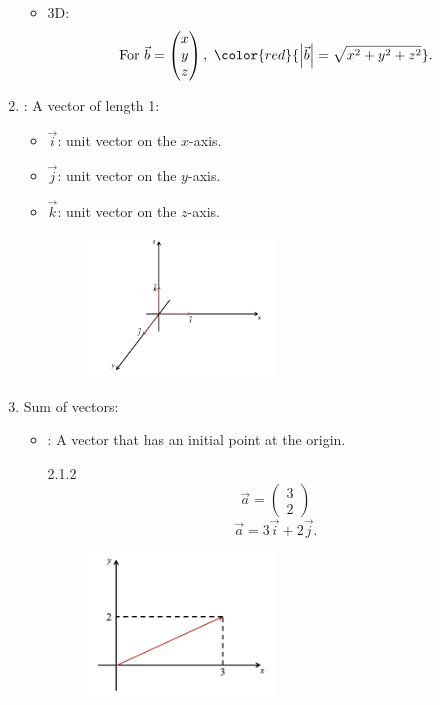 \documentclass[12pt, a4paper]{article}
\begin{document}
\begin{enumerate}
\begin{itemize}
    \item 3D: $$\text{For }\vec{b}=\begin{pmatrix}x\\y\\z\end{pmatrix},\ {\color{red}{\left|\vec{b}\right|=\sqrt{x^2+y^2+z^2}}}.$$
  \end{itemize}
  \item \textbf{\color{red}{Unit Vector}}: A vector of length 1: 
  \begin{itemize}
    \item $\vec{i}$: unit vector on the $x$-axis.
    \item $\vec{j}$: unit vector on the $y$-axis.
    \item $\vec{k}$: unit vector on the $z$-axis.
    \begin{figure}[H]
      \centering
      \includegraphics[width=0.5\textwidth]{Fig.3.jpg}
    \end{figure}
  \end{itemize}
  \item Sum of vectors: 
  \begin{itemize}
    \item \textbf{\color{red}{Position vector}}: A vector that has an initial point at the origin. 
    \begin{example}{2.1.2}{}
      $$\vec{a}=\begin{pmatrix}3\\2\end{pmatrix}$$
      $$\vec{a}=3\vec{i}+2\vec{j}.$$
      \begin{figure}[H]
        \centering
        \includegraphics[width=0.5\textwidth]{Fig.4.jpg}

\end{figure}
\end{example}
\end{itemize}
\end{enumerate}
\end{document}
